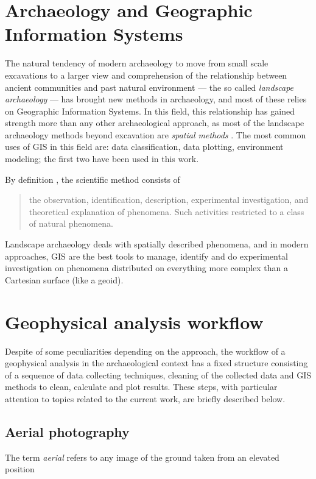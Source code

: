     \section{Archaeology and Geographic Information Systems}
        The natural tendency of modern archaeology to move from small scale excavations to a larger view and comprehension of the relationship between ancient communities and past natural environment --- the so called \emph{landscape archaeology} --- has brought new methods in archaeology, and most of these relies on Geographic Information Systems. In this field, this relationship has gained strength more than any other archaeological approach, as most of the landscape archaeology methods beyond excavation are \emph{spatial methods} \cite[preface]{space-archaeology}. The most common uses of GIS in this field are: data classification, data plotting, environment modeling; the first two have been used in this work.

        By definition \cite{american-dict}, the scientific method consists of
        \begin{quote}
            the observation, identification, description, experimental investigation, and theoretical explanation of phenomena. Such activities restricted to a class of natural phenomena.
        \end{quote}
        Landscape archaeology deals with spatially described phenomena, and in modern approaches, GIS are the best tools to manage, identify and do experimental investigation on phenomena distributed on everything more complex than a Cartesian surface (like a geoid).

    \section{Geophysical analysis workflow}
        Despite of some peculiarities depending on the approach, the workflow of a geophysical analysis in the archaeological context has a fixed structure consisting of a sequence of data collecting techniques, cleaning of the collected data and GIS methods to clean, calculate and plot results. These steps, with particular attention to topics related to the current work, are briefly described below.

        \subsection{Aerial photography}
            The term \emph{aerial} refers to any image of the ground taken from an elevated position \cite[p.~452]{terrestrial-remote}

